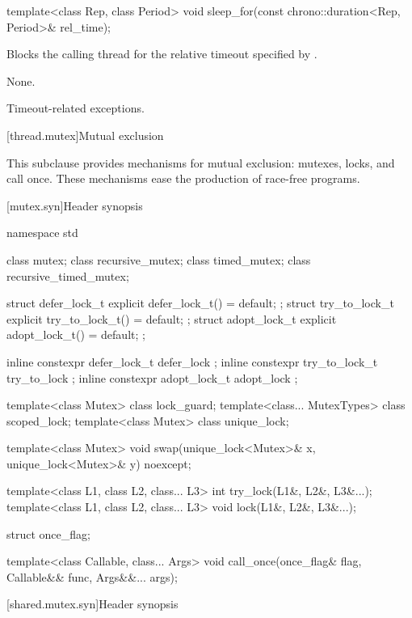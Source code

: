 %
\begin{itemdecl}
template<class Rep, class Period>
  void sleep_for(const chrono::duration<Rep, Period>& rel_time);
\end{itemdecl}

\begin{itemdescr}
\pnum
{}%
\effects
Blocks the calling thread for the relative timeout specified
by .

\pnum
\sync
None.

\pnum
\throws
Timeout-related exceptions.
\end{itemdescr}

[thread.mutex]{Mutual exclusion}

\pnum
This subclause provides mechanisms for mutual exclusion: mutexes, locks, and call
once. These mechanisms ease the production of race-free
programs.

[mutex.syn]{Header  synopsis}

%
\begin{codeblock}
namespace std {
  class mutex;
  class recursive_mutex;
  class timed_mutex;
  class recursive_timed_mutex;

  struct defer_lock_t { explicit defer_lock_t() = default; };
  struct try_to_lock_t { explicit try_to_lock_t() = default; };
  struct adopt_lock_t { explicit adopt_lock_t() = default; };

  inline constexpr defer_lock_t  defer_lock { };
  inline constexpr try_to_lock_t try_to_lock { };
  inline constexpr adopt_lock_t  adopt_lock { };

  template<class Mutex> class lock_guard;
  template<class... MutexTypes> class scoped_lock;
  template<class Mutex> class unique_lock;

  template<class Mutex>
    void swap(unique_lock<Mutex>& x, unique_lock<Mutex>& y) noexcept;

  template<class L1, class L2, class... L3> int try_lock(L1&, L2&, L3&...);
  template<class L1, class L2, class... L3> void lock(L1&, L2&, L3&...);

  struct once_flag;

  template<class Callable, class... Args>
    void call_once(once_flag& flag, Callable&& func, Args&&... args);
}
\end{codeblock}

[shared.mutex.syn]{Header  synopsis}

